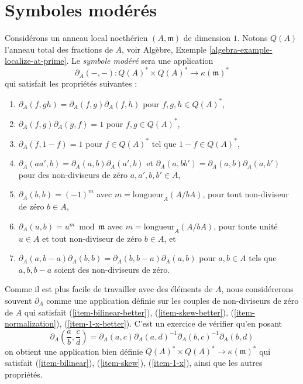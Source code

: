 \section{Symboles modérés}
\label{section-tame-symbol}

\noindent
Considérons un anneau local noethérien $(A, \mathfrak m)$ de dimension $1$.
Notons $Q(A)$ l'anneau total des fractions de $A$, voir
Algèbre, Exemple \ref{algebra-example-localize-at-prime}.
Le {\it symbole modéré} sera une application
$$
\partial_A(-, -) : Q(A)^* \times Q(A)^* \longrightarrow \kappa(\mathfrak m)^*
$$
qui satisfait les propriétés suivantes :
\begin{enumerate}
\item $\partial_A(f, gh) = \partial_A(f, g) \partial_A(f, h)$
\label{item-bilinear}
pour $f, g, h \in Q(A)^*$,
\item $\partial_A(f, g) \partial_A(g, f) = 1$
\label{item-skew}
pour $f, g \in Q(A)^*$,
\item $\partial_A(f, 1 - f) = 1$
\label{item-1-x}
pour $f \in Q(A)^*$ tel que $1 - f \in Q(A)^*$,
\item $\partial_A(aa', b) = \partial_A(a, b)\partial_A(a', b)$
\label{item-bilinear-better}
et $\partial_A(a, bb') = \partial_A(a, b)\partial_A(a, b')$
pour des non-diviseurs de zéro $a, a', b, b' \in A$,
\item $\partial_A(b, b) = (-1)^m$
\label{item-skew-better}
avec $m = \text{longueur}_A(A/bA)$,
pour tout non-diviseur de zéro $b \in A$,
\item $\partial_A(u, b) = u^m \bmod \mathfrak m$
\label{item-normalization}
avec $m = \text{longueur}_A(A/bA)$, pour toute unité $u \in A$ et tout
non-diviseur de zéro $b \in A$, et
\item
\label{item-1-x-better}
$\partial_A(a, b - a)\partial_A(b, b) = \partial_A(b, b - a)\partial_A(a, b)$
pour $a, b \in A$ tels que $a, b, b - a$ soient des non-diviseurs de zéro.
\end{enumerate}
Comme il est plus facile de travailler avec des éléments de $A$, nous
considérerons souvent $\partial_A$ comme une application définie sur les couples de
non-diviseurs de zéro de $A$ qui satisfait (\ref{item-bilinear-better}),
(\ref{item-skew-better}), (\ref{item-normalization}),
(\ref{item-1-x-better}). C'est un exercice de vérifier qu'en
posant
$$
\partial_A(\frac{a}{b}, \frac{c}{d}) =
\partial_A(a, c) \partial_A(a, d)^{-1} \partial_A(b, c)^{-1} \partial_A(b, d)
$$
on obtient une application bien définie $Q(A)^* \times Q(A)^* \to \kappa(\mathfrak m)^*$
qui satisfait (\ref{item-bilinear}), (\ref{item-skew}), (\ref{item-1-x}),
ainsi que les autres propriétés.

